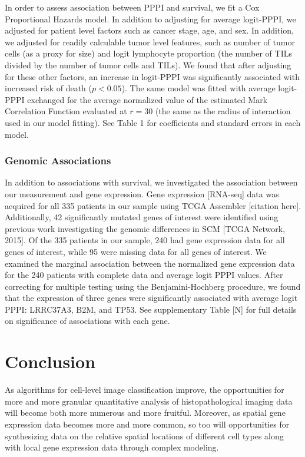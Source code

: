 \documentclass[
]{book}
\begin{document}
In order to assess association between PPPI and survival, we fit a Cox
Proportional Hazards model. In addition to adjusting for average
logit-PPPI, we adjusted for patient level factors such as cancer stage,
age, and sex. In addition, we adjusted for readily calculable tumor
level features, such as number of tumor cells (as a proxy for size) and
logit lymphocyte proportion (the number of TILs divided by the number of
tumor cells and TILs). We found that after adjusting for these other
factors, an increase in logit-PPPI was significantly associated with
increased risk of death (\(p < 0.05\)). The same model was fitted with
average logit-PPPI exchanged for the average normalized value of the
estimated Mark Correlation Function evaluated at \(r = 30\) (the same as
the radius of interaction used in our model fitting). See Table 1 for
coefficients and standard errors in each model.

\hypertarget{genomic-associations}{%
\subsection{Genomic Associations}\label{genomic-associations}}

In addition to associations with survival, we investigated the
association between our measurement and gene expression. Gene expression
{[}RNA-seq{]} data was acquired for all 335 patients in our sample using
TCGA Assembler {[}citation here{]}. Additionally, 42 significantly mutated
genes of interest were identified using previous work investigating the
genomic differences in SCM {[}TCGA Network, 2015{]}. Of the 335 patients
in our sample, 240 had gene expression data for all genes of interest,
while 95 were missing data for all genes of interest. We examined the
marginal association between the normalized gene expression data for the
240 patients with complete data and average logit PPPI values. After
correcting for multiple testing using the Benjamini-Hochberg procedure,
we found that the expression of three genes were significantly
associated with average logit PPPI: LRRC37A3, B2M, and TP53. See
supplementary Table {[}N{]} for full details on significance of
associations with each gene.

\hypertarget{conclusion}{%
\chapter{Conclusion}\label{conclusion}}

As algorithms for cell-level image classification improve, the
opportunities for more and more granular quantitative analysis of
histopathological imaging data will become both more numerous and more
fruitful. Moreover, as spatial gene expression data becomes more and
more common, so too will opportunities for synthesizing data on the
relative spatial locations of different cell types along with local gene
expression data through complex modeling.
\end{document}
